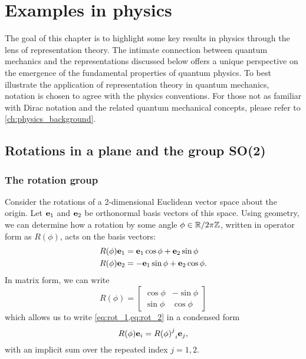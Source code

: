 \chapter{Examples in physics}\label{ch:Phys_applications}

The goal of this chapter is to highlight some key results in physics through the lens of representation theory. The intimate connection between quantum mechanics and the representations discussed below offers a unique perspective on the emergence of the fundamental properties of quantum physics. To best illustrate the application of representation theory in quantum mechanics, notation is chosen to agree with the physics conventions. For those not as familiar with Dirac notation and the related quantum mechanical concepts, please refer to \cref{ch:physics_background}.

\section{Rotations in a plane and the group SO(2)}\label{sec:SO2}


\subsection{The rotation group}
Consider the rotations of a 2-dimensional Euclidean vector space about the origin. Let $\mathbf{e}_1$ and $\mathbf{e}_2$ be orthonormal basis vectors of this space. Using geometry, we can determine how a rotation by some angle $\phi\in\mathbb{R}/2\pi\mathbb{Z}$, written in operator form as $R(\phi)$, acts on the basis vectors:
\begin{align}
    R(\phi)\mathbf{e}_1 &= \mathbf{e}_1\cos\phi + \mathbf{e}_2\sin\phi \label{eq:rot_1}\\
    R(\phi)\mathbf{e}_2 &= -\mathbf{e}_1\sin\phi + \mathbf{e}_2\cos\phi.\label{eq:rot_2}
\end{align}
In matrix form, we can write
\begin{equation}
    R(\phi) = 
    \begin{bmatrix}
        \cos\phi & -\sin\phi \\
        \sin\phi & \cos\phi
    \end{bmatrix}
\end{equation}
which allows us to write \cref{eq:rot_1,eq:rot_2} in a condensed form
\begin{equation}
    R(\phi)\mathbf{e}_i = {{R(\phi)}^j}_i\mathbf{e}_j,
\end{equation}
with an implicit sum over the repeated index $j=1,2$.

